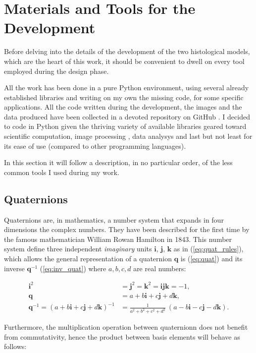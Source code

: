 \section{Materials and Tools for the Development}
Before delving into the details of the development of the two histological models, which are the heart of this work, it should be convenient to dwell on every tool employed during the design phase.

All the work has been done in a pure Python environment, using several already established libraries and writing on my own the missing code, for some specific applications. All the code written during the development, the images and the data produced have been collected in a devoted repository on GitHub \cite{repo}. I decided to code in Python given the thriving variety of available libraries geared toward scientific computation, image processing , data analysys and last but not least for its ease of use (compared to other programming languages).

In this section it will follow a description, in no particular order, of the less common tools I used during my work.

\subsection{Quaternions}
Quaternions are, in mathematics, a number system that expands in four dimensions the complex numbers. They have been described for the first time by the famous mathematician William Rowan Hamilton in 1843. This number system define three independent \textit{imaginary} units $\bm{i}$, $\bm{j}$, $\bm{k}$ as in (\ref{eq:quat_rules}), which allows the general representation of a quaternion $\bm{q}$ is (\ref{eq:quat}) and its inverse $\bm{q}^{-1}$ (\ref{eq:inv_quat}) where $a,b,c,d$ are real numbers:

\begin{align}
    \bm{i}^2 & = \bm{j}^2 = \bm{k}^2 = \bm{i}\bm{j}\bm{k} = -1, \label{eq:quat_rules}\\
    \bm{q} & = a + b\bm{i} + c\bm{j} + d\bm{k}, \label{eq:quat}\\
    \bm{q}^{-1 } = (a + b\bm{i} + c\bm{j} + d\bm{k})^{-1} & = \frac{1}{a^2 + b^2 + c^2 +d^2}\ (a - b\bm{i} - c\bm{j} - d\bm{k}). \label{eq:inv_quat}
\end{align}

Furthermore, the multiplication operation between quaternionn does not benefit from commutativity, hence the product between basis elements will behave as follows:

